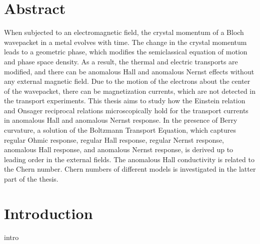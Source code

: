\documentclass{report}
\begin{document}
\chapter*{\center Abstract}%
%
When subjected to an electromagnetic field, the crystal momentum of a Bloch wavepacket in a metal evolves with time. The change in the crystal momentum leads to a geometric phase, which modifies the semiclassical equation of motion and phase space density. As a result, the thermal and electric transports are modified, and there can be anomalous Hall and anomalous Nernst effects without any external magnetic field. Due to the motion of the electrons about the center of the wavepacket, there can be magnetization currents, which are not detected in the transport experiments. This thesis aims to study how the Einstein relation and Onsager reciprocal relations microscopically hold for the transport currents in anomalous Hall and anomalous Nernst response. In the presence of Berry curvature, a solution of the Boltzmann Transport Equation, which captures regular Ohmic response, regular Hall response, regular Nernst response, anomalous Hall response, and anomalous Nernst response, is derived up to leading order in the external fields. The anomalous Hall conductivity is related to the Chern number. Chern numbers of different models is investigated in the latter part of the thesis.


\tableofcontents





\chapter{Introduction}
intro
\end{document}
